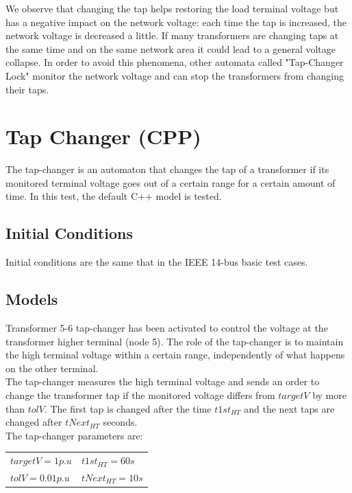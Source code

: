\documentclass[a4paper, 12pt]{report}
\begin{document}
We observe that changing the tap helps restoring the load terminal voltage but has a negative impact on the network voltage: each time the tap is increased, the network voltage is decreased a little. If many transformers are changing taps at the same time and on the same network area it could lead to a general voltage collapse. In order to avoid this phenomena, other automata called "Tap-Changer Lock" monitor the network voltage and can stop the transformers from changing their taps.


\newpage
\section{Tap Changer (CPP)}
\label{TapChangerAutomatonCpp}

The tap-changer is an automaton that changes the tap of a transformer if its monitored terminal voltage goes out of a certain range for a certain amount of time. In this test, the default C++ model is tested.

\subsection{Initial Conditions}

Initial conditions are the same that in the IEEE 14-bus basic test cases.

\subsection{Models}

Transformer 5-6 tap-changer has been activated to control the voltage at the transformer higher terminal (node 5). The role of the tap-changer is to maintain the high terminal voltage within a certain range, independently of what happens on the other terminal. \\

The tap-changer measures the high terminal voltage and sends an order to change the transformer tap if the monitored voltage differs from $targetV$ by more than $tolV$. The first tap is changed after the time $t1st_{HT}$ and the next taps are changed after $tNext_{HT}$ seconds.\\

The tap-changer parameters are:
\begin{center}
\begin{tabular}{l|l}
   $targetV=1p.u$ & $t1st_{HT}=60s$ \\
   $tolV=0.01p.u$  & $tNext_{HT}=10s$ \\
\end{tabular}
\end{center}
\end{document}
